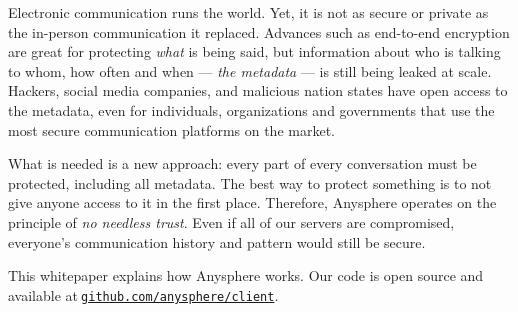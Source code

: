 
Electronic communication runs the world. Yet, it is not as secure or private as the in-person communication it replaced. Advances such as end-to-end encryption are great for protecting \textit{what} is being said, but information about who is talking to whom, how often and when — \textit{the metadata} — is still being leaked at scale. Hackers, social media companies, and malicious nation states have open access to the metadata, even for individuals, organizations and governments that use the most secure communication platforms on the market.



What is needed is a new approach: every part of every conversation must be protected, including all metadata. The best way to protect something is to not give anyone access to it in the first place. Therefore, Anysphere operates on the principle of \textit{no needless trust}. Even if all of our servers are compromised, everyone's communication history and pattern would still be secure.

This whitepaper explains how Anysphere works. Our code is open source and available at$~${\tt \href{https://github.com/anysphere/client}{github.com/anysphere/client}}.